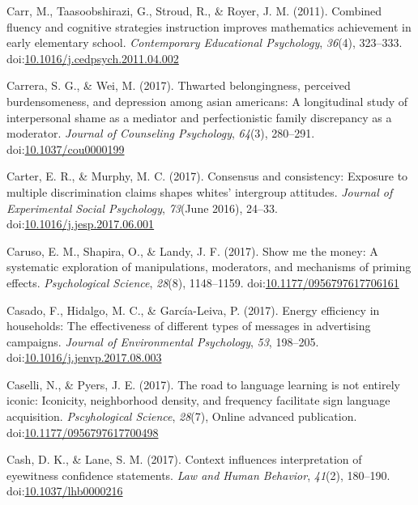 \documentclass[english,man]{apa6}
\theoremstyle{definition}
\theoremstyle{definition}
\theoremstyle{definition}
\theoremstyle{remark}
\begin{document}
\hypertarget{ref-Carr2011}{}
Carr, M., Taasoobshirazi, G., Stroud, R., \& Royer, J. M. (2011).
Combined fluency and cognitive strategies instruction improves
mathematics achievement in early elementary school. \emph{Contemporary
Educational Psychology}, \emph{36}(4), 323--333.
doi:\href{https://doi.org/10.1016/j.cedpsych.2011.04.002}{10.1016/j.cedpsych.2011.04.002}

\hypertarget{ref-Carrera2017}{}
Carrera, S. G., \& Wei, M. (2017). Thwarted belongingness, perceived
burdensomeness, and depression among asian americans: A longitudinal
study of interpersonal shame as a mediator and perfectionistic family
discrepancy as a moderator. \emph{Journal of Counseling Psychology},
\emph{64}(3), 280--291.
doi:\href{https://doi.org/10.1037/cou0000199}{10.1037/cou0000199}

\hypertarget{ref-Carter2017}{}
Carter, E. R., \& Murphy, M. C. (2017). Consensus and consistency:
Exposure to multiple discrimination claims shapes whites' intergroup
attitudes. \emph{Journal of Experimental Social Psychology},
\emph{73}(June 2016), 24--33.
doi:\href{https://doi.org/10.1016/j.jesp.2017.06.001}{10.1016/j.jesp.2017.06.001}

\hypertarget{ref-Caruso2017}{}
Caruso, E. M., Shapira, O., \& Landy, J. F. (2017). Show me the money: A
systematic exploration of manipulations, moderators, and mechanisms of
priming effects. \emph{Psychological Science}, \emph{28}(8), 1148--1159.
doi:\href{https://doi.org/10.1177/0956797617706161}{10.1177/0956797617706161}

\hypertarget{ref-Casado2017}{}
Casado, F., Hidalgo, M. C., \& García-Leiva, P. (2017). Energy
efficiency in households: The effectiveness of different types of
messages in advertising campaigns. \emph{Journal of Environmental
Psychology}, \emph{53}, 198--205.
doi:\href{https://doi.org/10.1016/j.jenvp.2017.08.003}{10.1016/j.jenvp.2017.08.003}

\hypertarget{ref-Caselli2017}{}
Caselli, N., \& Pyers, J. E. (2017). The road to language learning is
not entirely iconic: Iconicity, neighborhood density, and frequency
facilitate sign language acquisition. \emph{Pscyhological Science},
\emph{28}(7), Online advanced publication.
doi:\href{https://doi.org/10.1177/0956797617700498}{10.1177/0956797617700498}

\hypertarget{ref-Cash2017}{}
Cash, D. K., \& Lane, S. M. (2017). Context influences interpretation of
eyewitness confidence statements. \emph{Law and Human Behavior},
\emph{41}(2), 180--190.
doi:\href{https://doi.org/10.1037/lhb0000216}{10.1037/lhb0000216}
\end{document}
